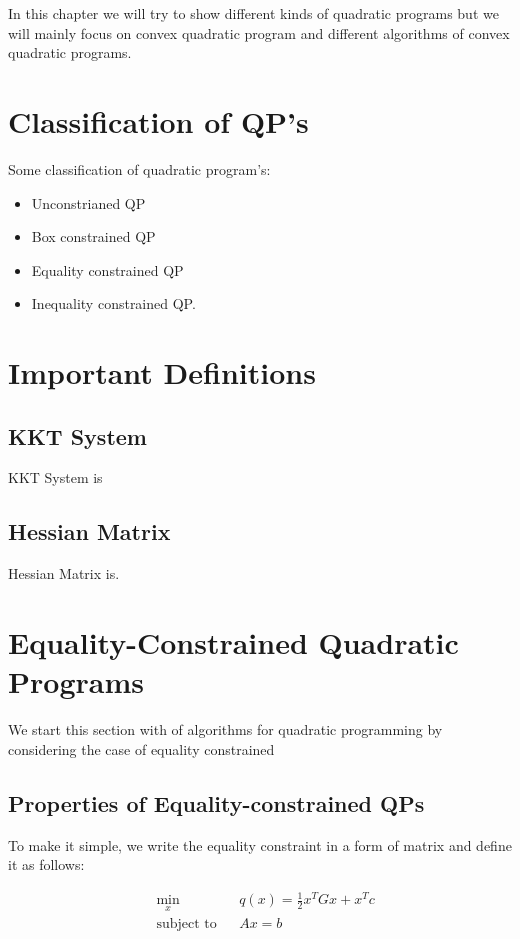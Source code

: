In this chapter we will try to show different kinds of quadratic programs but we will mainly focus on convex quadratic program and different algorithms of convex quadratic programs.

\section{Classification of QP's}

Some classification of quadratic program's:
\begin{itemize}
	\item Unconstrianed QP
	\item Box constrained QP
	\item Equality constrained QP
	\item Inequality constrained QP.
\end{itemize}

\section*{Important Definitions}
\subsection*{KKT System}
KKT System is
\subsection*{Hessian Matrix}
Hessian Matrix is.

\section{Equality-Constrained Quadratic Programs}

We start this section with of algorithms for quadratic programming by considering the case of equality constrained

\subsection*{Properties of Equality-constrained QPs}
To make it simple, we write the equality constraint in a form of matrix and define it as follows:

\begin{equation}
\begin{aligned}
& \underset{x}{\text{min}}
& & q(x)= \frac{1}{2}x^{T}Gx+x^{T}c \\
& \text{subject to} & &  Ax=b
\end{aligned}
\label{eqn:equality_constrained_QP}
\end{equation}

